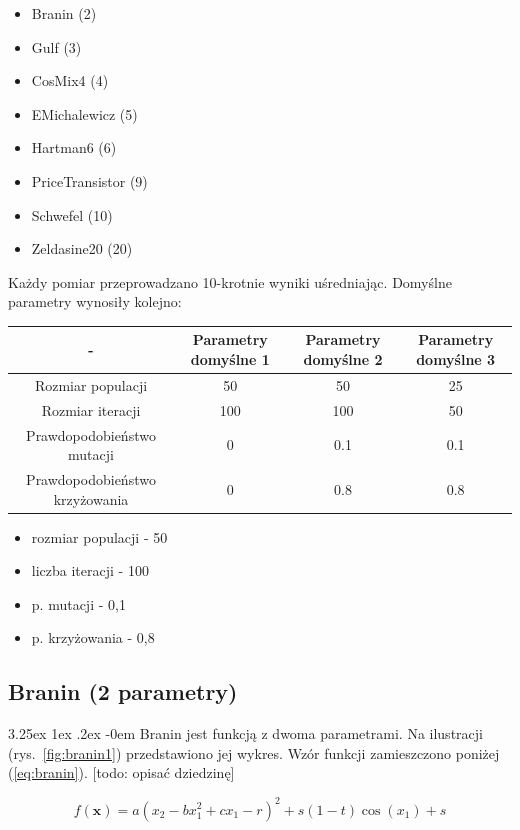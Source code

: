 \documentclass[11pt, a4paper]{article}
\makeatletter
\newcommand{\fbi}{\leavevmode{\parindent=1em\indent}}
\renewcommand\paragraph{\@startsection{paragraph}{5}{\z@}%
  {3.25ex \@plus1ex \@minus.2ex}%
  {-0em}%
  {\normalfont\normalsize\bfseries}}
\makeatother
\begin{document}
\begin{itemize}
	\item Branin (2)
	\item Gulf (3)
	\item CosMix4 (4)
	\item EMichalewicz (5)
	\item Hartman6 (6)
	\item PriceTransistor (9)
	\item Schwefel (10)
	\item Zeldasine20 (20)
\end{itemize}

\fbi
Każdy pomiar przeprowadzano 10-krotnie wyniki uśredniając. Domyślne parametry wynosiły kolejno:

\begin{tabular}{|c|c|c|c|}
	\hline
	- & Parametry domyślne 1 & Parametry domyślne 2 & Parametry domyślne 3 \\ 
	\hline \hline
	Rozmiar populacji & 50 & 50 & 25 \\ 
	\hline 
	Rozmiar iteracji & 100 & 100 & 50 \\ 
	\hline 
	Prawdopodobieństwo mutacji & 0 & 0.1 & 0.1 \\ 
	\hline 
	Prawdopodobieństwo krzyżowania & 0 & 0.8 & 0.8 \\ 
	\hline 
\end{tabular} 

\begin{itemize}
	\item rozmiar populacji - 50
	\item liczba iteracji - 100
	\item p. mutacji - 0,1
	\item p. krzyżowania - 0,8
\end{itemize}

\subsection{Branin (2 parametry)}
\paragraph{}
Branin jest funkcją z dwoma parametrami. Na ilustracji (rys.~\ref{fig:branin1}) przedstawiono jej wykres. Wzór funkcji zamieszczono poniżej (\ref{eq:branin}).
[todo: opisać dziedzinę]


\begin{equation}\label{eq:branin}
	f(\boldsymbol{x}) = a(x_2 - bx_1^2 + cx_1 - r)^2 + s(1 - t)\cos(x_1) + s
\end{equation}
\end{document}

